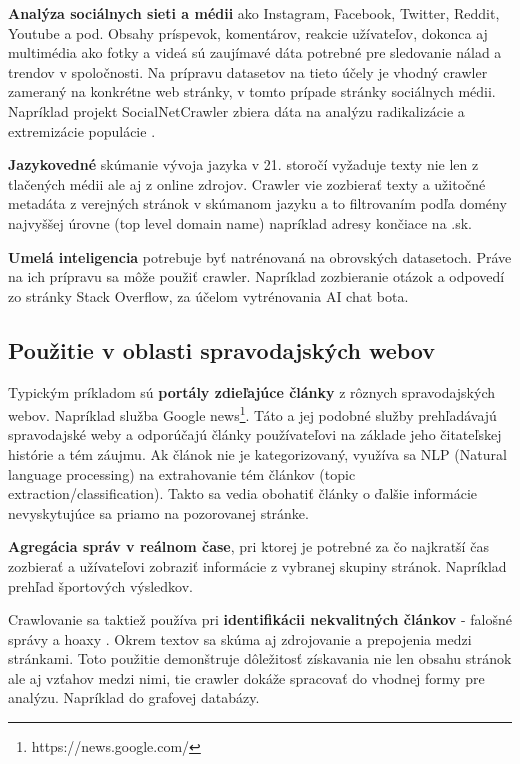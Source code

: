 \textbf{Analýza sociálnych sieti a médii} ako Instagram, Facebook, Twitter, Reddit, Youtube a pod. Obsahy príspevok, komentárov, reakcie užívateľov, dokonca aj multimédia ako fotky a videá sú zaujímavé dáta potrebné pre sledovanie nálad a trendov v spoločnosti. Na prípravu datasetov na tieto účely je vhodný crawler zameraný na konkrétne web stránky, v tomto prípade stránky sociálnych médii. Napríklad projekt SocialNetCrawler zbiera dáta na analýzu radikalizácie a extremizácie populácie \cite{socialNetCrawler}.

\textbf{Jazykovedné} skúmanie vývoja jazyka v 21. storočí vyžaduje texty nie len z tlačených médii ale aj z online zdrojov. Crawler vie zozbierať texty a užitočné metadáta z verejných stránok v skúmanom jazyku a to filtrovaním podľa domény najvyššej úrovne (top level domain name) napríklad adresy končiace na .sk.

\textbf{Umelá inteligencia} potrebuje byť natrénovaná na obrovských datasetoch. Práve na ich prípravu sa môže použiť crawler. Napríklad zozbieranie otázok a odpovedí zo stránky Stack Overflow, za účelom vytrénovania AI chat bota. \cite{stackOverflowCrawl}

\subsection{Použitie v oblasti spravodajských webov}
Typickým príkladom sú \textbf{portály zdieľajúce články} z rôznych spravodajských webov. Napríklad služba Google news\footnote{https://news.google.com/}. Táto a jej podobné služby prehľadávajú spravodajské weby a odporúčajú články používateľovi na základe jeho čitateľskej histórie a tém záujmu. Ak článok nie je kategorizovaný, využíva sa NLP (Natural language processing) na extrahovanie tém článkov (topic extraction/classification). Takto sa vedia obohatiť články o ďalšie informácie nevyskytujúce sa priamo na pozorovanej stránke.

\textbf{Agregácia správ v reálnom čase}, pri ktorej je potrebné za čo najkratší čas zozbierať a užívateľovi zobraziť informácie z vybranej skupiny stránok. Napríklad prehľad športových výsledkov. 

Crawlovanie sa taktiež používa pri \textbf{identifikácii nekvalitných článkov} - falošné správy a hoaxy \cite{fakeNews}. Okrem textov sa skúma aj zdrojovanie a prepojenia medzi stránkami. Toto použitie demonštruje dôležitosť získavania nie len obsahu stránok ale aj vzťahov medzi nimi, tie crawler dokáže spracovať do vhodnej formy pre analýzu. Napríklad do grafovej databázy. 



